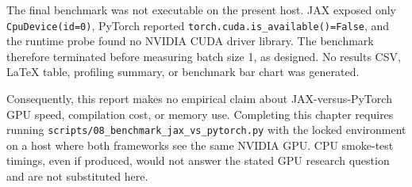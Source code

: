 The final benchmark was not executable on the present host.  JAX exposed only
\texttt{CpuDevice(id=0)}, PyTorch reported
\texttt{torch.cuda.is\_available()=False}, and the runtime probe found no
NVIDIA CUDA driver library.  The benchmark therefore terminated before
measuring batch size 1, as designed.  No results CSV, LaTeX table, profiling
summary, or benchmark bar chart was generated.

Consequently, this report makes no empirical claim about JAX-versus-PyTorch
GPU speed, compilation cost, or memory use.  Completing this chapter requires
running \texttt{scripts/08\_benchmark\_jax\_vs\_pytorch.py} with the locked
environment on a host where both frameworks see the same NVIDIA GPU.  CPU
smoke-test timings, even if produced, would not answer the stated GPU research
question and are not substituted here.

